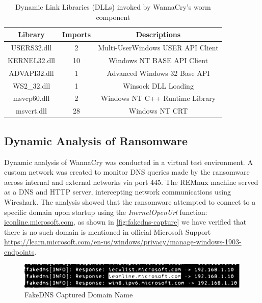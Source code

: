 \documentclass[12pt,letterpaper]{article}
\begin{document}
        \begin{table}[ht]
            \centering
            \caption{Dynamic Link Libraries (DLLs) invoked by WannaCry's worm component}
            \label{tab:DLL-Link1 File}
            \begin{tabular}{ccc}
                \toprule
                \textbf{Library} & \textbf{Imports} & \textbf{Descriptions} \\
                \midrule
                USERS32.dll & 2& Multi-UserWindows USER API Client\\
                KERNEL32.dll & 10& Windows NT BASE API Client\\
                ADVAPI32.dll & 1& Advanced Windows 32 Base API\\
                WS2\_32.dll & 1& Winsock DLL Loading\\
                msvcp60.dll & 2 &  Windows NT C++ Runtime Library \\
                msvcrt.dll & 28 & Windows NT CRT \\
                \bottomrule
            \end{tabular}
        \end{table}


    \subsection{Dynamic Analysis of Ransomware}
        \label{sec: Dynamic Analysis of Ransomware}

    Dynamic analysis of WannaCry was conducted in a virtual test environment. A custom network was created to monitor DNS queries made by the ransomware across internal and external networks via port 445. The REMnux machine served as a DNS and HTTP server, intercepting network communications using Wireshark. The analysis showed that the ransomware attempted to connect to a specific domain upon startup using the \textit{InernetOpenUrl} function: \url{ieonline.microsoft.com}, as shown in \autoref{fig:fakedns-capture} we have verified that there is no such domain is mentioned in official Microsoft Support \url{https://learn.microsoft.com/en-us/windows/privacy/manage-windows-1903-endpoints}.

    \begin{figure}[hbtt]
        \centering
        \includegraphics[width= \textwidth]{images/urlfakedns.pdf}
        \caption{FakeDNS Captured Domain Name}
        \label{fig:fakedns-capture}
    \end{figure}
\end{document}
